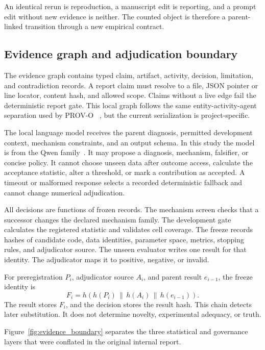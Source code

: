 An identical rerun is reproduction, a manuscript edit is reporting, and a
prompt edit without new evidence is neither. The counted object is therefore
a parent-linked transition through a new empirical contract.

\subsection{Evidence graph and adjudication boundary}

The evidence graph contains typed claim, artifact, activity, decision,
limitation, and contradiction records. A report claim must resolve to a file,
JSON pointer or line locator, content hash, and allowed scope. Claims without
a live edge fail the deterministic report gate. This local graph follows the
same entity-activity-agent separation used by PROV-O
~\cite{lebo2013provo}, but the current serialization is project-specific.

The local language model receives the parent diagnosis, permitted development
context, mechanism constraints, and an output schema. In this study the model
is from the Qwen family~\cite{yang2025qwen3}. It may propose a diagnosis,
mechanism, falsifier, or concise policy. It cannot choose unseen data after
outcome access, calculate the acceptance statistic, alter a threshold, or
mark a contribution as accepted. A timeout or malformed response selects a
recorded deterministic fallback and cannot change numerical adjudication.

All decisions are functions of frozen records. The mechanism screen checks
that a successor changes the declared mechanism family. The development gate
calculates the registered statistic and validates cell coverage. The freeze
records hashes of candidate code, data identities, parameter space, metrics,
stopping rules, and adjudicator source. The unseen evaluator writes one result
for that identity. The adjudicator maps it to positive, negative, or invalid.

For preregistration \(P_i\), adjudicator source \(A_i\), and parent result
\(e_{i-1}\), the freeze identity is
\[
F_i=h\!\left(h(P_i)\,\|\,h(A_i)\,\|\,h(e_{i-1})\right).
\]
The result stores \(F_i\), and the decision stores the result hash. This chain
detects later substitution. It does not determine novelty, experimental
adequacy, or truth.

Figure~\ref{fig:evidence_boundary} separates the three statistical and
governance layers that were conflated in the original internal report.


